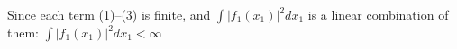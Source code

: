 Since each term (1)–(3) is finite, and \( \int |f_1(x_1)|^2 dx_1 \) is a linear combination of them: \(\int |f_1(x_1)|^2 dx_1 < \infty\)




